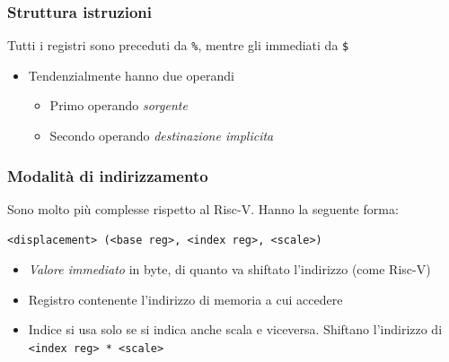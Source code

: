 \subsubsection*{Struttura istruzioni}
Tutti i registri sono preceduti da \verb|%|, mentre gli immediati da \verb|$|
\begin{itemize}
	\item Tendenzialmente hanno due operandi
	      \begin{itemize}
		      \item Primo operando \textit{sorgente}
		      \item Secondo operando \textit{destinazione implicita}
	      \end{itemize}
\end{itemize}
\subsubsection*{Modalità di indirizzamento}
Sono molto più complesse rispetto al Risc-V. Hanno la seguente forma:
\begin{center}
	\verb|<displacement> (<base reg>, <index reg>, <scale>)|
\end{center}
\begin{itemize}
	\item \textit{Valore immediato} in byte, di quanto va shiftato l'indirizzo (come Risc-V)
	\item Registro contenente l'indirizzo di memoria a cui accedere
	\item Indice si usa solo se si indica anche scala e viceversa. Shiftano l'indirizzo di \verb|<index reg> * <scale>|
\end{itemize}
